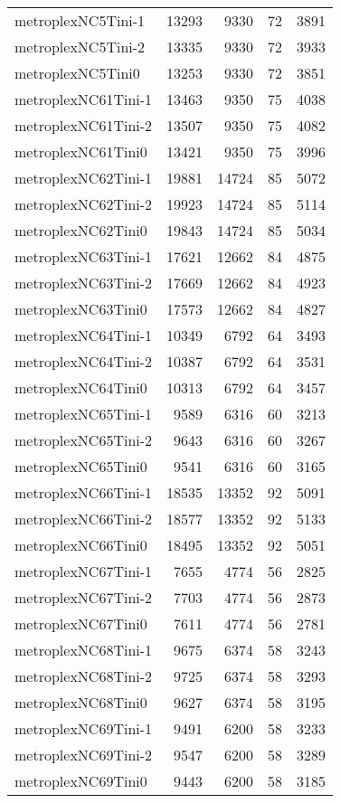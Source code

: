 \begin{tabular}{lrrrr}
metroplexNC5Tini-1 & 13293 & 9330 & 72 & 3891 \\
metroplexNC5Tini-2 & 13335 & 9330 & 72 & 3933 \\
metroplexNC5Tini0 & 13253 & 9330 & 72 & 3851 \\
metroplexNC61Tini-1 & 13463 & 9350 & 75 & 4038 \\
metroplexNC61Tini-2 & 13507 & 9350 & 75 & 4082 \\
metroplexNC61Tini0 & 13421 & 9350 & 75 & 3996 \\
metroplexNC62Tini-1 & 19881 & 14724 & 85 & 5072 \\
metroplexNC62Tini-2 & 19923 & 14724 & 85 & 5114 \\
metroplexNC62Tini0 & 19843 & 14724 & 85 & 5034 \\
metroplexNC63Tini-1 & 17621 & 12662 & 84 & 4875 \\
metroplexNC63Tini-2 & 17669 & 12662 & 84 & 4923 \\
metroplexNC63Tini0 & 17573 & 12662 & 84 & 4827 \\
metroplexNC64Tini-1 & 10349 & 6792 & 64 & 3493 \\
metroplexNC64Tini-2 & 10387 & 6792 & 64 & 3531 \\
metroplexNC64Tini0 & 10313 & 6792 & 64 & 3457 \\
metroplexNC65Tini-1 & 9589 & 6316 & 60 & 3213 \\
metroplexNC65Tini-2 & 9643 & 6316 & 60 & 3267 \\
metroplexNC65Tini0 & 9541 & 6316 & 60 & 3165 \\
metroplexNC66Tini-1 & 18535 & 13352 & 92 & 5091 \\
metroplexNC66Tini-2 & 18577 & 13352 & 92 & 5133 \\
metroplexNC66Tini0 & 18495 & 13352 & 92 & 5051 \\
metroplexNC67Tini-1 & 7655 & 4774 & 56 & 2825 \\
metroplexNC67Tini-2 & 7703 & 4774 & 56 & 2873 \\
metroplexNC67Tini0 & 7611 & 4774 & 56 & 2781 \\
metroplexNC68Tini-1 & 9675 & 6374 & 58 & 3243 \\
metroplexNC68Tini-2 & 9725 & 6374 & 58 & 3293 \\
metroplexNC68Tini0 & 9627 & 6374 & 58 & 3195 \\
metroplexNC69Tini-1 & 9491 & 6200 & 58 & 3233 \\
metroplexNC69Tini-2 & 9547 & 6200 & 58 & 3289 \\
metroplexNC69Tini0 & 9443 & 6200 & 58 & 3185 \\

\end{tabular}

